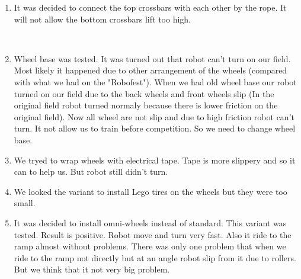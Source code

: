 \begin{enumerate}
\begin{enumerate}
		\item It was decided to connect the top crossbars with each other by the rope. It will not allow the bottom crossbars lift too high.
		\begin{figure}[H]
			\begin{minipage}[h]{0.2\linewidth}
				\center  
			\end{minipage}
			\begin{minipage}[h]{0.6\linewidth}
				\caption{}
			\end{minipage}
		\end{figure}
		
		\item Wheel base was tested. It was turned out that robot can't turn on our field. Most likely it happened due to other arrangement of the wheels (compared with what we had on the "Robofest"). When we had old wheel base our robot turned on our field due to the back wheels and front wheels slip (In the original field robot turned normaly because there is lower friction on the original field). Now all wheel are not slip and due to high friction robot can't turn. It not allow us to train before competition. So we need to change wheel base.
		
		\item We tryed to wrap wheels with electrical tape. Tape is more slippery and so it can to help us. But robot still didn't turn.
		
		\item We looked the variant to install Lego tires on the wheels but they were too small.
		
		\item It was decided to install omni-wheels instead of standard. This variant was tested. Result is positive. Robot move and turn very fast. Also it ride to the ramp almost without problems. There was only one problem that when we ride to the ramp not directly but at an angle robot slip from it due to rollers. But we think that it not very big problem.
		

\end{enumerate}
\end{enumerate}
